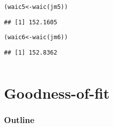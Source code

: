 \documentclass[color=usenames,dvipsnames]{beamer}\usepackage[]{graphicx}\usepackage[]{color}
\makeatletter
\newcommand{\hlstd}[1]{\textcolor[rgb]{0,0,0}{#1}}%
\newcommand{\hlkwb}[1]{\textcolor[rgb]{0,0.341,0.682}{#1}}%
\newcommand{\hlkwd}[1]{\textcolor[rgb]{0.004,0.004,0.506}{#1}}%
\newenvironment{kframe}{%
 \def\at@end@of@kframe{}%
 \ifinner\ifhmode%
  \def\at@end@of@kframe{\end{minipage}}%
  \begin{minipage}{\columnwidth}%
 \fi\fi%
 \def\FrameCommand##1{\hskip\@totalleftmargin \hskip-\fboxsep
 \colorbox{shadecolor}{##1}\hskip-\fboxsep
     \hskip-\linewidth \hskip-\@totalleftmargin \hskip\columnwidth}%
 \MakeFramed {\advance\hsize-\width
   \@totalleftmargin\z@ \linewidth\hsize
   \@setminipage}}%
 {\par\unskip\endMakeFramed%
 \at@end@of@kframe}
\newenvironment{knitrout}{}{} %
\makeatother
\begin{document}
\begin{frame}[fragile]
\begin{columns}
\begin{column}{0.5\textwidth}
\begin{knitrout}
\end{knitrout}
\begin{knitrout}\scriptsize
{}\color{fgcolor}\begin{kframe}
\begin{alltt}
\hlstd{(waic5} \hlkwb{<-} \hlkwd{waic}\hlstd{(jm5))}
\end{alltt}
\begin{verbatim}
## [1] 152.1605
\end{verbatim}
\end{kframe}
\end{knitrout}
\begin{knitrout}\scriptsize
{}\color{fgcolor}\begin{kframe}
\begin{alltt}
\hlstd{(waic6} \hlkwb{<-} \hlkwd{waic}\hlstd{(jm6))}
\end{alltt}
\begin{verbatim}
## [1] 152.8362
\end{verbatim}
\end{kframe}
\end{knitrout}
    \end{column}
  \end{columns}
\end{frame}



\section{Goodness-of-fit}



\begin{frame}[plain]
  \frametitle{Outline}
  \Large
  \tableofcontents[currentsection]
\end{frame}
\end{document}
